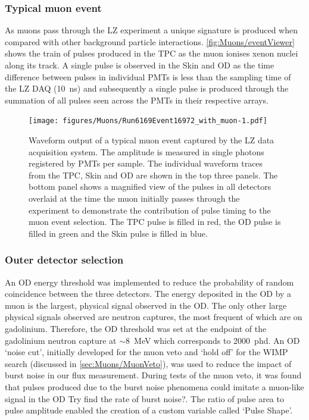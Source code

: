 \subsubsection{Typical muon event}
As muons pass through the LZ experiment a unique signature is produced when compared with other background particle interactions. \autoref{fig:Muons/eventViewer} shows the train of pulses produced in the TPC as the muon ionises xenon nuclei along its track. A single pulse is observed in the Skin and OD as the time difference between pulses in individual PMTs is less than the sampling time of the LZ DAQ (10~ns) and subsequently a single pulse is produced through the summation of all pulses seen across the PMTs in their respective arrays.
\begin{figure}[ht!]
    \centering \texttt{[image: figures/Muons/Run6169Event16972\_with\_muon-1.pdf]}
    \caption{Waveform output of a typical muon event captured by the LZ data acquisition system. The amplitude is measured in single photons registered by PMTs per sample. The individual waveform traces from the TPC, Skin and OD are shown in the top three panels. The bottom panel shows a magnified view of the pulses in all detectors overlaid at the time the muon initially passes through the experiment to demonstrate the contribution of pulse timing to the muon event selection. The TPC pulse is filled in red, the OD pulse is filled in green and the Skin pulse is filled in blue.}
    \label{fig:Muons/eventViewer}
\end{figure}

\subsubsection{Outer detector selection}\label{sec:Muons/MuonFluxODSelection}
An OD energy threshold was implemented to reduce the probability of random coincidence between the three detectors. The energy deposited in the OD by a muon is the largest, physical signal observed in the OD. The only other large physical signals observed are neutron captures, the most frequent of which are on gadolinium. Therefore, the OD threshold was set at the endpoint of the gadolinium neutron capture at $\sim$8~MeV which corresponds to 2000~phd.
An OD `noise cut', initially developed for the muon veto and `hold off' for the WIMP search (discussed in \autoref{sec:Muons/MuonVeto}), was used to reduce the impact of burst noise in our flux measurement. During tests of the muon veto, it was found that pulses produced due to the burst noise phenomena could imitate a muon-like signal in the OD {\color{red}Try find the rate of burst noise?}. The ratio of pulse area to pulse amplitude enabled the creation of a custom variable called `Pulse Shape'.

